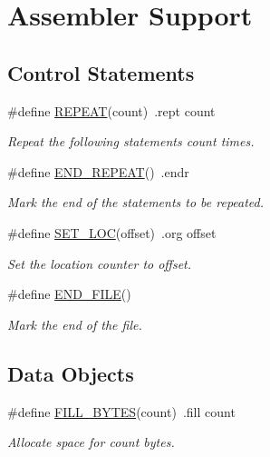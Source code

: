 \hypertarget{group__assembler__group}{\section{Assembler Support}
\label{group__assembler__group}
}
\subsection*{Control Statements}
\begin{DoxyCompactItemize}
\item 
\#define \hyperlink{group__assembler__group_ga17f8b386ac2ef0f331bdaa4f5e21b71b}{R\-E\-P\-E\-A\-T}(count)~.rept   count
\begin{DoxyCompactList}\small\item\em Repeat the following statements {\itshape count} times. \end{DoxyCompactList}\item 
\#define \hyperlink{group__assembler__group_gaa53644ea7a4fec702079e066770eed6d}{E\-N\-D\-\_\-\-R\-E\-P\-E\-A\-T}()~.endr
\begin{DoxyCompactList}\small\item\em Mark the end of the statements to be repeated. \end{DoxyCompactList}\item 
\#define \hyperlink{group__assembler__group_ga3a8bd27aec4611e3c0d1168f092272a5}{S\-E\-T\-\_\-\-L\-O\-C}(offset)~.org    offset
\begin{DoxyCompactList}\small\item\em Set the location counter to {\itshape offset}. \end{DoxyCompactList}\item 
\#define \hyperlink{group__assembler__group_ga7795075d7ca3529a86ce8e60fc6f0adb}{E\-N\-D\-\_\-\-F\-I\-L\-E}()
\begin{DoxyCompactList}\small\item\em Mark the end of the file. \end{DoxyCompactList}\end{DoxyCompactItemize}
\subsection*{Data Objects}
\begin{DoxyCompactItemize}
\item 
\#define \hyperlink{group__assembler__group_ga3ab35e172e72f27c4210f5009fb35202}{F\-I\-L\-L\-\_\-\-B\-Y\-T\-E\-S}(count)~.fill   count
\begin{DoxyCompactList}\small\item\em Allocate space for {\itshape count} bytes. \end{DoxyCompactList}\end{DoxyCompactItemize}
